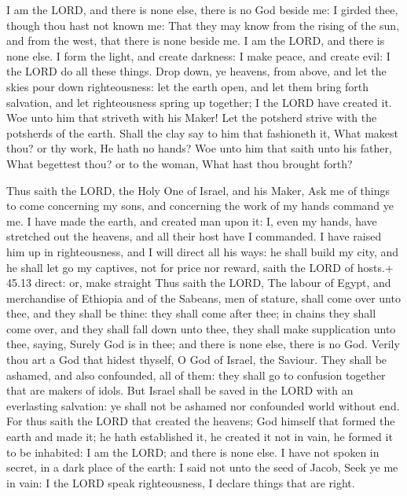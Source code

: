  I am the LORD, and there is none else, there is no God
beside me: I girded thee, though thou hast not known me: 
That they may know from the rising of the sun, and from the west, that
there is none beside me. I am the LORD, and there is none else.
 I form the light, and create darkness: I make peace, and
create evil: I the LORD do all these things.  Drop down, ye
heavens, from above, and let the skies pour down righteousness: let the
earth open, and let them bring forth salvation, and let righteousness
spring up together; I the LORD have created it.  Woe unto
him that striveth with his Maker! Let the potsherd strive with the
potsherds of the earth. Shall the clay say to him that fashioneth it,
What makest thou? or thy work, He hath no hands?  Woe unto
him that saith unto his father, What begettest thou? or to the woman,
What hast thou brought forth?

 Thus saith the LORD, the Holy One of Israel, and his
Maker, Ask me of things to come concerning my sons, and concerning the
work of my hands command ye me.  I have made the earth, and
created man upon it: I, even my hands, have stretched out the heavens,
and all their host have I commanded.  I have raised him up
in righteousness, and I will direct all his ways: he shall build my
city, and he shall let go my captives, not for price nor reward, saith
the LORD of hosts.+ 45.13 direct: or, make straight  Thus
saith the LORD, The labour of Egypt, and merchandise of Ethiopia and of
the Sabeans, men of stature, shall come over unto thee, and they shall
be thine: they shall come after thee; in chains they shall come over,
and they shall fall down unto thee, they shall make supplication unto
thee, saying, Surely God is in thee; and there is none else, there is no
God.  Verily thou art a God that hidest thyself, O God of
Israel, the Saviour.  They shall be ashamed, and also
confounded, all of them: they shall go to confusion together that are
makers of idols.  But Israel shall be saved in the LORD
with an everlasting salvation: ye shall not be ashamed nor confounded
world without end.  For thus saith the LORD that created
the heavens; God himself that formed the earth and made it; he hath
established it, he created it not in vain, he formed it to be inhabited:
I am the LORD; and there is none else.  I have not spoken
in secret, in a dark place of the earth: I said not unto the seed of
Jacob, Seek ye me in vain: I the LORD speak righteousness, I declare
things that are right.

